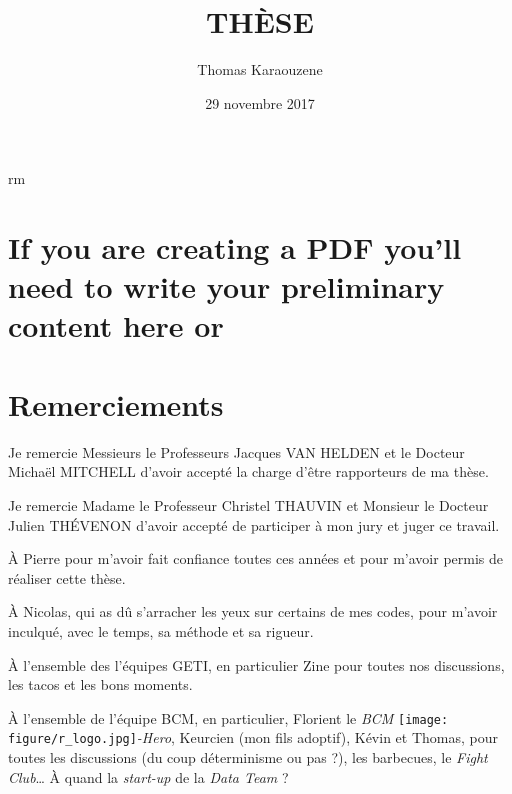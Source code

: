 \documentclass[12pt,a4paper,twoside]{ugathesis}
\title{THÈSE}
\author{Thomas Karaouzene}
\date{29 novembre 2017}
\begin{document}
  \maketitle

\frontmatter %
\pagestyle{empty} %



  \hypersetup{linkcolor=black}
  \setcounter{tocdepth}{3}
  \tableofcontents

  \listoftables

  \listoffigures
rm 


\mainmatter %
\pagestyle{fancyplain} %

\chapter{If you are creating a PDF you'll need to write your preliminary
content here
or}\label{if-you-are-creating-a-pdf-youll-need-to-write-your-preliminary-content-here-or}

\chapter*{Remerciements}\label{remerciements}

\newpage

Je remercie Messieurs le Professeurs Jacques VAN HELDEN et le Docteur
Michaël MITCHELL d'avoir accepté la charge d'être rapporteurs de ma
thèse.

Je remercie Madame le Professeur Christel THAUVIN et Monsieur le Docteur
Julien THÉVENON d'avoir accepté de participer à mon jury et juger ce
travail.

À Pierre pour m'avoir fait confiance toutes ces années et pour m'avoir
permis de réaliser cette thèse.

À Nicolas, qui as dû s'arracher les yeux sur certains de mes codes, pour
m'avoir inculqué, avec le temps, sa méthode et sa rigueur.

À l'ensemble des l'équipes GETI, en particulier Zine pour toutes nos
discussions, les tacos et les bons moments.

À l'ensemble de l'équipe BCM, en particulier, Florient le \emph{BCM}
\texttt{[image: figure/r\_logo.jpg]}\emph{-Hero},
Keurcien (mon fils adoptif), Kévin et Thomas, pour toutes les
discussions (du coup déterminisme ou pas ?), les barbecues, le
\emph{Fight Club}\ldots{} À quand la \emph{start-up} de la \emph{Data
Team} ?
\end{document}
